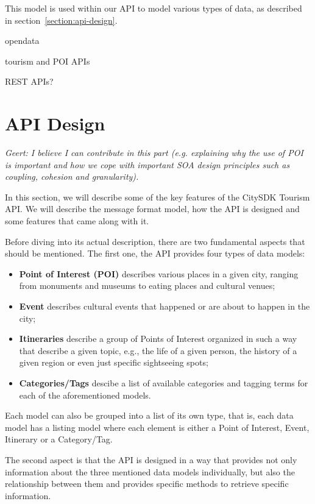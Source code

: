 \documentclass[times]{ettauth}
\begin{document}
This model is used within our API to model various types of data, as described in section~\ref{section:api-design}.

opendata

tourism and POI APIs

REST APIs?


\section{API Design}

\emph{Geert: I believe I can contribute in this part (e.g. explaining why the use of POI is important and how we cope with important SOA design principles such as coupling, cohesion and granularity).}

In this section, we will describe some of the key features of the CitySDK Tourism API. We will describe the message format model, how the API is designed and some features that came along with it.

Before diving into its actual description, there are two fundamental aspects that should be mentioned. The first one, the API provides four types of data models:
\begin{itemize}
\item \textbf{Point of Interest (POI)} describes various places in a given city, ranging from monuments and museums to eating places and cultural venues; 
\item \textbf{Event} describes cultural events that happened or are about to happen in the city;
\item \textbf{Itineraries} describe a group of Points of Interest organized in such a way that describe a given topic, e.g., the life of a given person, the history of a given region or even just specific sightseeing spots;
\item \textbf{Categories/Tags} descibe a list of available categories and tagging terms for each of the aforementioned models.
\end{itemize}

Each model can also be grouped into a list of its own type, that is, each data model has a listing model where each element is either a Point of Interest, Event, Itinerary or a Category/Tag.

The second aspect is that the API is designed in a way that provides not only information about the three mentioned data models individually, but also the relationship between them and provides specific methods to retrieve specific information.
\end{document}
